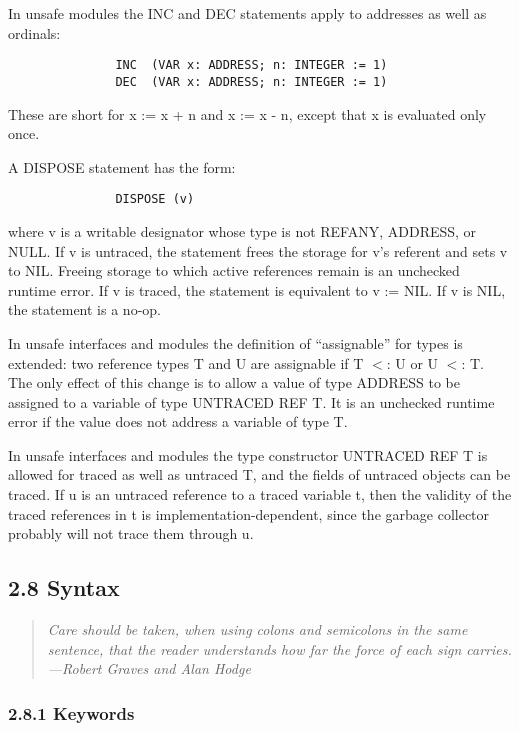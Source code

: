 \documentclass[10pt]{article}
\begin{document}
In unsafe modules the INC and DEC statements apply to addresses as well as
ordinals:
\begin{verbatim}
               INC  (VAR x: ADDRESS; n: INTEGER := 1)
               DEC  (VAR x: ADDRESS; n: INTEGER := 1)
\end{verbatim}
These are short for x := x + n and x := x - n, except that x is evaluated only
once.

A DISPOSE statement has the form:
\begin{verbatim}
               DISPOSE (v)
\end{verbatim}
where v is a writable designator whose type is not REFANY, ADDRESS, or NULL.
If v is untraced, the statement frees the storage for v's referent and sets v
to NIL.  Freeing storage to which active references remain is an unchecked
runtime error.  If v is traced, the statement is equivalent to v := NIL.  If v
is NIL, the statement is a no-op.

In unsafe interfaces and modules the definition of ``assignable'' for types is
extended: two reference types T and U are assignable if T $<$: U or U $<$: T.
The only effect of this change is to allow a value of type ADDRESS to be
assigned to a variable of type UNTRACED REF T.  It is an unchecked runtime
error if the value does not address a variable of type T.

In unsafe interfaces and modules the type constructor UNTRACED REF T is
allowed for traced as well as untraced T, and the fields of untraced objects
can be traced.  If u is an untraced reference to a traced variable t, then the
validity of the traced references in t is implementation-dependent, since the
garbage collector probably will not trace them through u.

\subsection*{2.8 Syntax}

\begin{quote}
  \emph{ Care should be taken, when using colons and semicolons in the same
    sentence, that the reader understands how far the force of each sign
    carries.  ---Robert Graves and Alan Hodge }
\end{quote}

\subsubsection*{2.8.1 Keywords}
\end{document}
